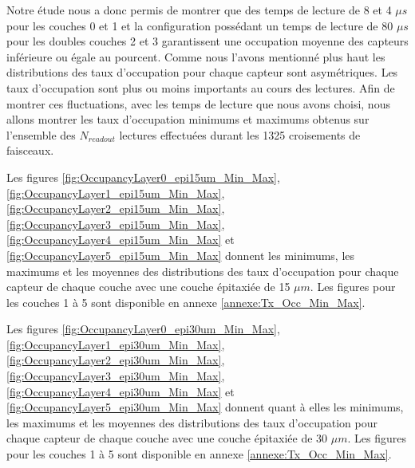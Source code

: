   \FloatBarrier
  
   Notre \'etude nous a donc permis de montrer que des temps de lecture de 8 et 4 $\mu s$ pour les couches 0 et 1 et la configuration poss\'edant un temps de lecture de 80 $\mu s$ pour les doubles couches 2 et 3 garantissent une occupation moyenne des capteurs inf\'erieure ou \'egale au pourcent. Comme nous l'avons mentionn\'e plus haut les distributions des taux d'occupation pour chaque capteur sont asym\'etriques. Les taux d'occupation sont plus ou moins importants au cours des lectures. Afin de montrer ces fluctuations, avec les temps de lecture que nous avons choisi, nous allons montrer les taux d'occupation minimums et maximums obtenus sur l'ensemble des $N_{readout}$ lectures effectu\'ees durant les 1325 croisements de faisceaux.
  
   \medskip
  
   Les figures \ref{fig:OccupancyLayer0_epi15um_Min_Max}, \ref{fig:OccupancyLayer1_epi15um_Min_Max}, \ref{fig:OccupancyLayer2_epi15um_Min_Max}, \ref{fig:OccupancyLayer3_epi15um_Min_Max}, \ref{fig:OccupancyLayer4_epi15um_Min_Max} et \ref{fig:OccupancyLayer5_epi15um_Min_Max} donnent les minimums, les maximums et les moyennes des distributions des taux d'occupation pour chaque capteur de chaque couche avec une couche \'epitaxi\'ee de 15 $\mu m$. Les figures pour les couches 1 \`a 5 sont disponible en annexe \ref{annexe:Tx_Occ_Min_Max}.
   
   \medskip
   
   Les figures \ref{fig:OccupancyLayer0_epi30um_Min_Max}, \ref{fig:OccupancyLayer1_epi30um_Min_Max}, \ref{fig:OccupancyLayer2_epi30um_Min_Max}, \ref{fig:OccupancyLayer3_epi30um_Min_Max}, \ref{fig:OccupancyLayer4_epi30um_Min_Max} et \ref{fig:OccupancyLayer5_epi30um_Min_Max} donnent quant \`a elles les minimums, les maximums et les moyennes des distributions des taux d'occupation pour chaque capteur de chaque couche avec une couche \'epitaxi\'ee de 30 $\mu m$. Les figures pour les couches 1 \`a 5 sont disponible en annexe \ref{annexe:Tx_Occ_Min_Max}.
   
